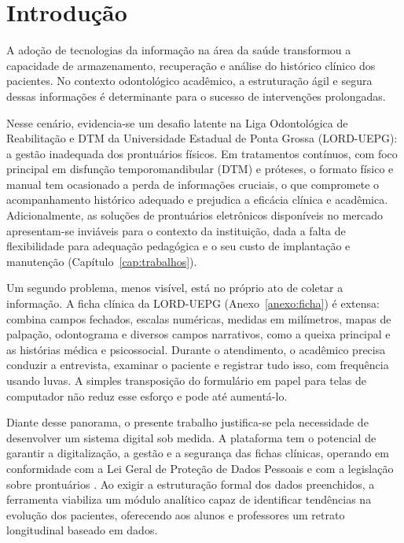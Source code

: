\chapter{Introdução}
\label{cap:introducao}

A adoção de tecnologias da informação na área da saúde transformou a capacidade de armazenamento, recuperação e análise do histórico clínico dos pacientes. No contexto odontológico acadêmico, a estruturação ágil e segura dessas informações é determinante para o sucesso de intervenções prolongadas.

Nesse cenário, evidencia-se um desafio latente na Liga Odontológica de Reabilitação e DTM da Universidade Estadual de Ponta Grossa (LORD-UEPG): a gestão inadequada dos prontuários físicos. Em tratamentos contínuos, com foco principal em disfunção temporomandibular (DTM) e próteses, o formato físico e manual tem ocasionado a perda de informações cruciais, o que compromete o acompanhamento histórico adequado e prejudica a eficácia clínica e acadêmica. Adicionalmente, as soluções de prontuários eletrônicos disponíveis no mercado apresentam-se inviáveis para o contexto da instituição, dada a falta de flexibilidade para adequação pedagógica e o seu custo de implantação e manutenção (Capítulo~\ref{cap:trabalhos}).

Um segundo problema, menos visível, está no próprio ato de coletar a informação. A ficha clínica da LORD-UEPG (Anexo~\ref{anexo:ficha}) é extensa: combina campos fechados, escalas numéricas, medidas em milímetros, mapas de palpação, odontograma e diversos campos narrativos, como a queixa principal e as histórias médica e psicossocial. Durante o atendimento, o acadêmico precisa conduzir a entrevista, examinar o paciente e registrar tudo isso, com frequência usando luvas. A simples transposição do formulário em papel para telas de computador não reduz esse esforço e pode até aumentá-lo.

Diante desse panorama, o presente trabalho justifica-se pela necessidade de desenvolver um sistema digital sob medida. A plataforma tem o potencial de garantir a digitalização, a gestão e a segurança das fichas clínicas, operando em conformidade com a Lei Geral de Proteção de Dados Pessoais \cite{lgpd2018} e com a legislação sobre prontuários \cite{lei13787,cfo91-2009}. Ao exigir a estruturação formal dos dados preenchidos, a ferramenta viabiliza um módulo analítico capaz de identificar tendências na evolução dos pacientes, oferecendo aos alunos e professores um retrato longitudinal baseado em dados.

